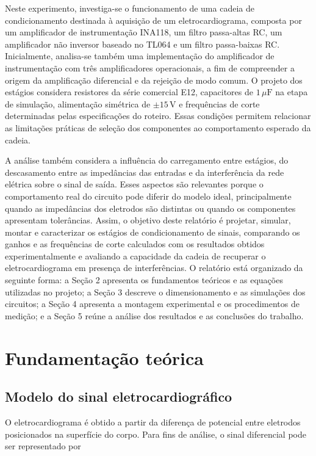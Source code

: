 \documentclass[11pt,a4paper]{article}
\begin{document}
Neste experimento, investiga-se o funcionamento de uma cadeia de condicionamento destinada à aquisição de um eletrocardiograma, composta por um amplificador de instrumentação INA118, um filtro passa-altas RC, um amplificador não inversor baseado no TL064 e um filtro passa-baixas RC. Inicialmente, analisa-se também uma implementação do amplificador de instrumentação com três amplificadores operacionais, a fim de compreender a origem da amplificação diferencial e da rejeição de modo comum. O projeto dos estágios considera resistores da série comercial E12, capacitores de $1\,\mu\mathrm{F}$ na etapa de simulação, alimentação simétrica de $\pm 15\,\mathrm{V}$ e frequências de corte determinadas pelas especificações do roteiro. Essas condições permitem relacionar as limitações práticas de seleção dos componentes ao comportamento esperado da cadeia.

A análise também considera a influência do carregamento entre estágios, do descasamento entre as impedâncias das entradas e da interferência da rede elétrica sobre o sinal de saída. Esses aspectos são relevantes porque o comportamento real do circuito pode diferir do modelo ideal, principalmente quando as impedâncias dos eletrodos são distintas ou quando os componentes apresentam tolerâncias. Assim, o objetivo deste relatório é projetar, simular, montar e caracterizar os estágios de condicionamento de sinais, comparando os ganhos e as frequências de corte calculados com os resultados obtidos experimentalmente e avaliando a capacidade da cadeia de recuperar o eletrocardiograma em presença de interferências. O relatório está organizado da seguinte forma: a Seção 2 apresenta os fundamentos teóricos e as equações utilizadas no projeto; a Seção 3 descreve o dimensionamento e as simulações dos circuitos; a Seção 4 apresenta a montagem experimental e os procedimentos de medição; e a Seção 5 reúne a análise dos resultados e as conclusões do trabalho.

\section{Fundamentação teórica}

\subsection{Modelo do sinal eletrocardiográfico}

O eletrocardiograma é obtido a partir da diferença de potencial entre eletrodos posicionados na superfície do corpo. Para fins de análise, o sinal diferencial pode ser representado por
\end{document}
